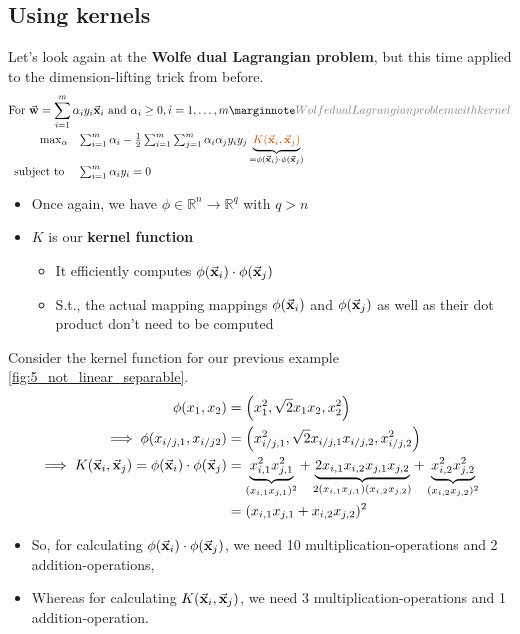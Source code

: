 \subsection{Using kernels}

Let's look again at the \textbf{Wolfe dual Lagrangian problem}, but this time applied to the dimension-lifting trick from before.
\begin{align*}\begin{aligned}
  &\text{For } \cv{w}=\sum_{i=1}^m \alpha_i y_i \cv{x}_i \text{ and } \alpha_i\geq0, i=1,\dots,m \sidenote{Wolfe dual Lagrangian problem with kernel}\\
  & \begin{array}{rl}
      \max_\alpha & \sum_{i=1}^m \alpha_i - \frac{1}{2} \sum_{i=1}^m \sum_{j=1}^m \alpha_i \alpha_j y_i y_j \underbrace{\color{burntorange}K(\cv{x}_i,\cv{x}_j)}_{=\phi(\cv{x}_i)\cdot\phi(\cv{x}_j)}\\
      \text{subject to } & \sum_{i=1}^m \alpha_i y_i = 0
  \end{array}
\end{aligned}\end{align*}
\begin{itemize}
  \item Once again, we have $\phi\in\mathbb{R}^n\rightarrow\mathbb{R}^q$ with $q>n$
  \item $K$ is our \textbf{kernel function}
  \begin{itemize}
    \item It efficiently computes $\phi(\vec{\mathbf{x}}_i)\cdot\phi(\vec{\mathbf{x}}_j)$
    \item S.t., the actual mapping mappings $\phi(\vec{\mathbf{x}}_i)$ and $\phi(\vec{\mathbf{x}}_j)$ as well as their dot product don't need to be computed
  \end{itemize}
\end{itemize}

\begin{note}
Consider the kernel function for our previous example \ref{fig:5_not_linear_separable}.
\begin{align*}
  \phi(x_1, x_2) &= \left(x_1^2, \sqrt{2}x_1x_2, x_2^2\right) \\
  \implies \phi(x_{i/j,1}, x_{i/j2}) &= \left(x_{i/j,1}^2, \sqrt{2}x_{i/j,1}x_{i/j,2}, x_{i/j,2}^2\right)\\
  \implies K(\vec{\mathbf{x}}_i, \vec{\mathbf{x}}_j) = \phi(\vec{\mathbf{x}}_i)\cdot\phi(\vec{\mathbf{x}}_j) &= \underbrace{x_{i,1}^2x_{j,1}^2}_{(x_{i,1}x_{j,1})^2} + \underbrace{2x_{i,1}x_{i,2}x_{j,1}x_{j,2}}_{2(x_{i,1}x_{j,1})(x_{i,2}x_{j,2})} + \underbrace{x_{i,2}^2x_{j,2}^2}_{(x_{i,2}x_{j,2})^2}\\
  &= (x_{i,1}x_{j,1} + x_{i,2}x_{j,2})^2
\end{align*}
\begin{itemize}
  \item So, for calculating $\phi(\vec{\mathbf{x}}_i)\cdot\phi(\vec{\mathbf{x}}_j)$, we need 10 multiplication-operations and 2 addition-operations,
  \item Whereas for calculating $K(\vec{\mathbf{x}}_i, \vec{\mathbf{x}}_j)$, we need 3 multiplication-operations and 1 addition-operation.
\end{itemize}
\end{note}

